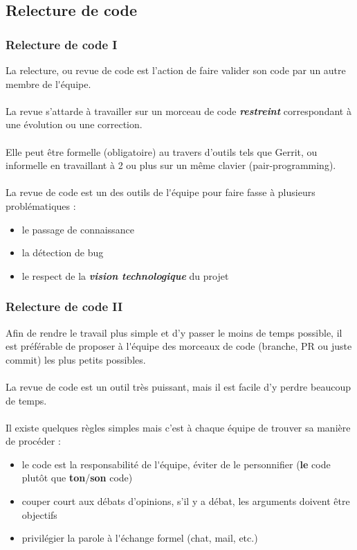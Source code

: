 \subsection{Relecture de code}
\begin{frame}
	\frametitle{Relecture de code I}
    La relecture, ou revue de code est l'action de faire valider son code par un autre membre de l\'{}\'{e}quipe.
    \\~\\
    La revue s'attarde \`{a} travailler sur un morceau de code \textbf{\textit{restreint}} correspondant \`{a} une \'{e}volution ou une correction.
    \\~\\
    Elle peut \^{e}tre formelle (obligatoire) au travers d'outils tels que Gerrit, ou informelle en travaillant \`{a} 2 ou plus sur un m\^{e}me clavier (pair-programming).
    \\~\\
    La revue de code est un des outils de l\'{}\'{e}quipe pour faire fasse \`{a} plusieurs probl\'{e}matiques :
    \begin{itemize}
        \item le passage de connaissance
        \item la d\'{e}tection de bug
        \item le respect de la \textbf{\textit{vision technologique}} du projet
    \end{itemize}
\end{frame}

\begin{frame}
	\frametitle{Relecture de code II}
    Afin de rendre le travail plus simple et d'y passer le moins de temps possible, il est pr\'{e}f\'{e}rable de proposer \`{a} l\'{}\'{e}quipe des morceaux de code (branche, PR ou juste commit) les plus petits possibles.
    \\~\\
    La revue de code est un outil tr\`{e}s puissant, mais il est facile d'y perdre beaucoup de temps.
    \\~\\
    Il existe quelques r\`{e}gles simples mais c'est \`{a} chaque \'{e}quipe de trouver sa mani\`{e}re de proc\'{e}der :
    \begin{itemize}
        \item le code est la responsabilit\'{e} de l\'{}\'{e}quipe, \'{e}viter de le personnifier (\textbf{le} code plut\^{o}t que \textbf{ton}/\textbf{son} code)
        \item couper court aux d\'{e}bats d'opinions, s'il y a d\'{e}bat, les arguments doivent \^{e}tre objectifs
        \item privil\'{e}gier la parole \`{a} l\'{}\'{e}change formel (chat, mail, etc.)
    \end{itemize}
\end{frame}

